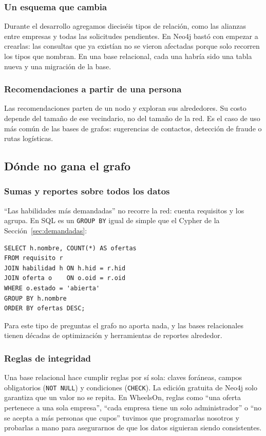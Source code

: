 \documentclass[11pt, a4paper]{article}
\begin{document}
\subsubsection{Un esquema que cambia}
Durante el desarrollo agregamos dieciséis tipos de relación, como las alianzas entre
empresas y todas las solicitudes pendientes. En Neo4j bastó con empezar a crearlas: las
consultas que ya existían no se vieron afectadas porque solo recorren los tipos que
nombran. En una base relacional, cada una habría sido una tabla nueva y una migración
de la base.

\subsubsection{Recomendaciones a partir de una persona}
Las recomendaciones parten de un nodo y exploran sus alrededores. Su costo depende del
tamaño de ese vecindario, no del tamaño de la red. Es el caso de uso más común de las
bases de grafos: sugerencias de contactos, detección de fraude o rutas logísticas.

\subsection{Dónde no gana el grafo}\label{sec:no-gana}

\subsubsection{Sumas y reportes sobre todos los datos}
``Las habilidades más demandadas'' no recorre la red: cuenta requisitos y los agrupa. En
SQL es un \texttt{GROUP BY} igual de simple que el Cypher de la Sección~\ref{sec:demandadas}:

\begin{lstlisting}[style=sql]
SELECT h.nombre, COUNT(*) AS ofertas
FROM requisito r
JOIN habilidad h ON h.hid = r.hid
JOIN oferta o    ON o.oid = r.oid
WHERE o.estado = 'abierta'
GROUP BY h.nombre
ORDER BY ofertas DESC;
\end{lstlisting}

Para este tipo de preguntas el grafo no aporta nada, y las bases relacionales tienen
décadas de optimización y herramientas de reportes alrededor.

\subsubsection{Reglas de integridad}
Una base relacional hace cumplir reglas por sí sola: claves foráneas, campos
obligatorios (\texttt{NOT NULL}) y condiciones (\texttt{CHECK}). La edición gratuita de
Neo4j solo garantiza que un valor no se repita. En WheelsOn, reglas como ``una oferta
pertenece a una sola empresa'', ``cada empresa tiene un solo administrador'' o ``no se
acepta a más personas que cupos'' tuvimos que programarlas nosotros y probarlas a
mano para asegurarnos de que los datos siguieran siendo consistentes.
\end{document}
